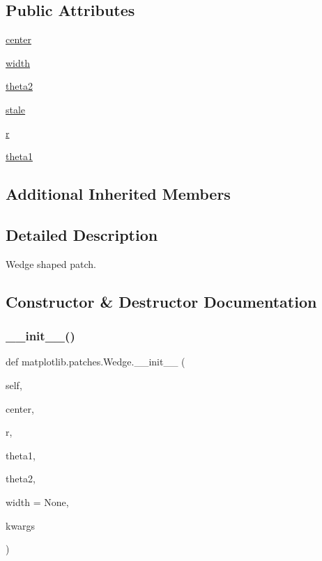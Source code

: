 \subsection*{Public Attributes}
\begin{DoxyCompactItemize}
\item 
\hyperlink{classmatplotlib_1_1patches_1_1Wedge_ad2d8888221ba8446bdc7ffa01c411b31}{center}
\item 
\hyperlink{classmatplotlib_1_1patches_1_1Wedge_af925ee3ece47ca8b5df17769462d67fd}{width}
\item 
\hyperlink{classmatplotlib_1_1patches_1_1Wedge_a3c4f354bb134e360bff5aa2f31541f55}{theta2}
\item 
\hyperlink{classmatplotlib_1_1patches_1_1Wedge_a5cee873ce75ebd65eb73ae3f06864965}{stale}
\item 
\hyperlink{classmatplotlib_1_1patches_1_1Wedge_a16c2f1788c90fcb7af34155e2c92a351}{r}
\item 
\hyperlink{classmatplotlib_1_1patches_1_1Wedge_a2c8dbb7f5d533fe98c390b45ed7b262c}{theta1}
\end{DoxyCompactItemize}
\subsection*{Additional Inherited Members}


\subsection{Detailed Description}
\begin{DoxyVerb}Wedge shaped patch.\end{DoxyVerb}
 

\subsection{Constructor \& Destructor Documentation}
\mbox{\label{classmatplotlib_1_1patches_1_1Wedge_aa196212402ad24ade5bf7071712dd07a}} 
\subsubsection{\texorpdfstring{\+\_\+\+\_\+init\+\_\+\+\_\+()}{\_\_init\_\_()}}
{\footnotesize\ttfamily def matplotlib.\+patches.\+Wedge.\+\_\+\+\_\+init\+\_\+\+\_\+ (\begin{DoxyParamCaption}\item[{}]{self,  }\item[{}]{center,  }\item[{}]{r,  }\item[{}]{theta1,  }\item[{}]{theta2,  }\item[{}]{width = {\ttfamily None},  }\item[{}]{kwargs }\end{DoxyParamCaption})}

